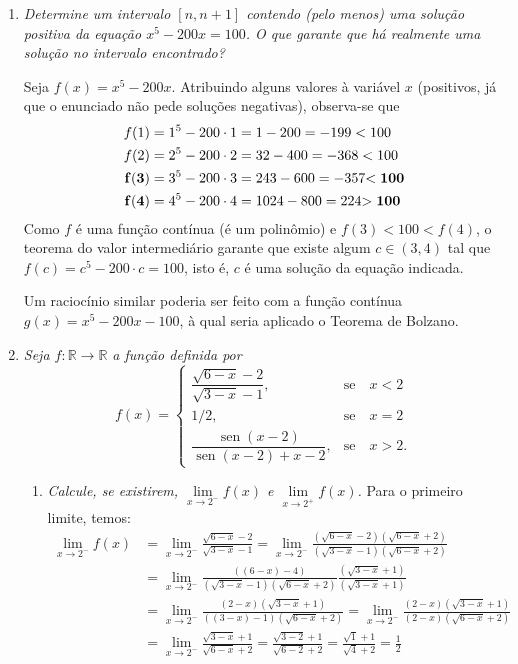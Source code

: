\documentclass[12pt,a4paper]{article}
\newcommand*\sen[1]{\operatorname{sen}{#1}}
\begin{document}
\begin{enumerate}
\begin{enumerate}
\end{enumerate}

\item \textit{Determine um intervalo $[n, n+1]$ contendo (pelo menos) uma solução positiva da equação $x^5 - 200x = 100$. O que garante que há realmente uma solução no intervalo encontrado?}

Seja $f(x) = x^5 - 200x$. Atribuindo alguns valores à variável $x$ (positivos, já que o enunciado não pede soluções negativas), observa-se que
\begin{align*}
f(1) & = 1^5 - 200 \cdot 1 = 1 - 200 = -199 < 100 \\
f(2) & = 2^5 - 200 \cdot 2 = 32 - 400 = -368 < 100 \\
\bf{ f(3) } & = 3^5 - 200 \cdot 3 = 243 - 600 =-357 \bf{ < 100 }\\
\bf{ f(4) } & = 4^5 - 200 \cdot 4 = 1024 - 800 =224 \bf{ > 100 }
\end{align*}
Como $f$ é uma função contínua (é um polinômio) e $f(3) < 100 < f(4)$, o teorema do valor intermediário garante que existe algum $c \in (3,4)$ tal que $f(c) = c^5 - 200 \cdot c = 100$, isto é, $c$ é uma solução da equação indicada.

Um raciocínio similar poderia ser feito com a função contínua $g(x) = x^5 - 200x - 100$, à qual seria aplicado o Teorema de Bolzano.

\item \textit{Seja $f: \mathbb{R} \to \mathbb{R}$ a função definida por}
\[
f(x) =
\left\{\begin{array}{ll}
\dfrac{\sqrt{6-x}-2}{\sqrt{3-x}-1}, & \text{se}\quad x < 2 \\
1/2, & \text{se}\quad x = 2 \\
\dfrac{\sen{(x-2)}}{\sen{(x-2)} + x-2}, & \text{se}\quad x > 2.
\end{array}\right.
\]
\begin{enumerate}
\item \textit{Calcule, se existirem, $\lim\limits_{x\to 2^-} f(x)$ e $\lim\limits_{x\to 2^+} f(x)$.}
Para o primeiro limite, temos:
\begin{align*}
\lim\limits_{x\to 2^-} f(x)
& = \lim\limits_{x\to 2^-} \frac{\sqrt{6-x}-2}{\sqrt{3-x}-1}
  = \lim\limits_{x\to 2^-} \frac{(\sqrt{6-x}-2)(\sqrt{6-x}+2)}{(\sqrt{3-x}-1)(\sqrt{6-x}+2)} \\
& = \lim\limits_{x\to 2^-} \frac{((6-x)-4)}{(\sqrt{3-x}-1)(\sqrt{6-x}+2)}
                           \frac{(\sqrt{3-x}+1)}{(\sqrt{3-x}+1)} \\
& = \lim\limits_{x\to 2^-} \frac{(2-x)(\sqrt{3-x}+1)}{((3-x)-1)(\sqrt{6-x}+2)}
  = \lim\limits_{x\to 2^-} \frac{(2-x)(\sqrt{3-x}+1)}{(2-x)(\sqrt{6-x}+2)} \\
& = \lim\limits_{x\to 2^-} \frac{\sqrt{3-x}+1}{\sqrt{6-x}+2}
  = \frac{\sqrt{3-2}+1}{\sqrt{6-2}+2}
  = \frac{\sqrt{1}+1}{\sqrt{4}+2}
  = \frac{1}{2}
\end{align*}


\end{enumerate}
\end{enumerate}
\end{document}
